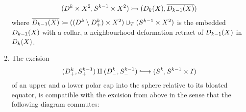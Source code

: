 \begin{Fact}
\begin{enumerate}
\begin{gather*}
      (D^{k}\times X^2, S^{k-1}\times X^2)
      \rightarrowtail
      (D_{k}({X}), \overline{D_{k-1}({X})})
    \end{gather*}
    where
    $\overline{D_{k-1}({X})}\coloneqq
    ((D^{k}\setminus D^{k}_+)\times X^2)
    \cup_{T}
    (S^{k-1}\times X^2)$
    is the embedded
    $D_{k-1}({X})$ with a collar, \idest a neighbourhood
    deformation retract of $D_{k-1}({X})$ in
    $D_{k}({X})$.
  \item
    The excision
    \begin{gather*}
      (\Disk{k}_+,\Sphere{k-1}_+) \amalg (\Disk{k}_-,\Sphere{k-1}_-)
      \immlongto
      (\Sphere k, \Sphere{k-1}\times I)
    \end{gather*}
    of an upper and a lower polar cap into the sphere relative to its
    bloated equator, is compatible with the excision from above
    in the sense that the following diagram commutes:
    \begin{center}
    \end{center}
  \end{enumerate}
\end{Fact}


